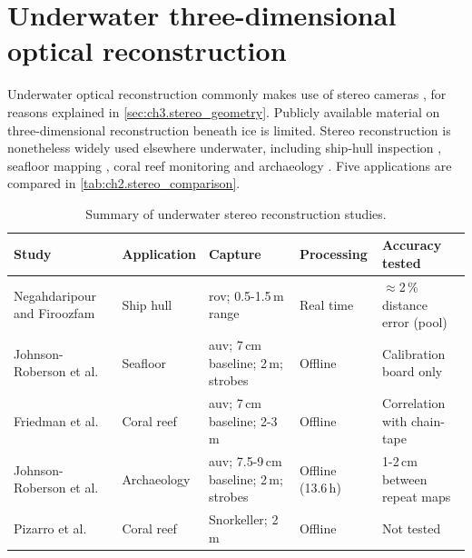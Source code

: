 \section{Underwater three-dimensional optical reconstruction }
\label{sec:ch2.reconstruction_techniques}
Underwater optical reconstruction commonly makes use of stereo cameras
\cite{massot-camposOpticalSensorsMethods2015,huOverviewUnderwater3D2023}, for reasons explained in \autoref{sec:ch3.stereo_geometry}.
Publicly available material on three-dimensional reconstruction beneath ice is limited.
Stereo reconstruction is nonetheless widely used elsewhere underwater, including ship-hull inspection
\cite{negahdaripourROVStereovisionSystem2006}, seafloor mapping
\cite{johnson-robersonGenerationVisualizationLargescale2010}, coral reef monitoring
\cite{friedmanMultiScaleMeasuresRugosity2012,pizarroSimpleFastRepeatable2017} and archaeology
\cite{johnson-robersonHighResolutionUnderwaterRobotic2017}.
Five applications are compared in \autoref{tab:ch2.stereo_comparison}.
\begin{table}[H]
\centering
\footnotesize
\renewcommand{\arraystretch}{1.2}
\caption{Summary of underwater stereo reconstruction studies.}
\label{tab:ch2.stereo_comparison}
\begin{tabularx}{\textwidth}{>{\raggedright\arraybackslash}p{2.6cm} Y Y Y Y}
\toprule
\textbf{Study} & \textbf{Application} & \textbf{Capture} & \textbf{Processing} & \textbf{Accuracy tested} \\
\midrule
Negahdaripour and Firoozfam~\cite{negahdaripourROVStereovisionSystem2006}
  & Ship hull & \acrshort{rov}; 0.5-1.5\,m range & Real time & $\approx$2\,\% distance error (pool) \\
Johnson-Roberson et al.~\cite{johnson-robersonGenerationVisualizationLargescale2010}
  & Seafloor & \acrshort{auv}; 7\,cm baseline; 2\,m; strobes & Offline & Calibration board only \\
Friedman et al.~\cite{friedmanMultiScaleMeasuresRugosity2012}
  & Coral reef & \acrshort{auv}; 7\,cm baseline; 2-3\,m & Offline & Correlation with chain-tape \\
Johnson-Roberson et al.~\cite{johnson-robersonHighResolutionUnderwaterRobotic2017}
  & Archaeology & \acrshort{auv}; 7.5-9\,cm baseline; 2\,m; strobes & Offline (13.6\,h) & 1-2\,cm between repeat maps \\
Pizarro et al.~\cite{pizarroSimpleFastRepeatable2017}
  & Coral reef & Snorkeller; 2\,m & Offline & Not tested \\
\bottomrule
\end{tabularx}
\end{table}


